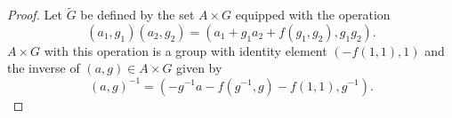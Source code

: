 \documentclass{dcthesis}
\newcommand{\wt}[1]{\widetilde{#1}}
\numberwithin{equation}{section}
\theoremstyle{definition}
\theoremstyle{remark}
\begin{document}
{{{\begin{proof}
      Let $\wt{G}$ be defined by the set $A\times G$ equipped
      with the operation
      \begin{equation}
        \label{eqn:Efmultiplication}
        (a_1,g_1)(a_2,g_2)=
        (a_1+g_1a_2+f(g_1,g_2), g_1g_2).
      \end{equation}
      $A\times G$ with this operation is a group
      with identity element
      $(-f(1,1), 1)$
      and the inverse of $(a,g)\in A\times G$
      given by
      \begin{equation}
        \label{eqn:aginverses}
        (a,g)^{-1}
        =
        (-g^{-1}a-f(g^{-1},g)-f(1,1), g^{-1}).
      \end{equation}

\end{proof}}}}
\end{document}
